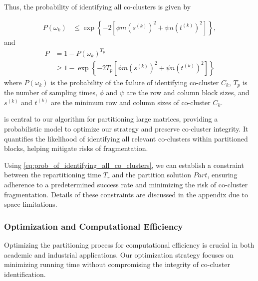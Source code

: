 \documentclass[letterpaper, 10 pt, conference]{ieeeconf}  %
\begin{document}

Thus, the probability of identifying all co-clusters is given by

\begin{equation}
    \begin{split}
        P(\omega_k) & \le \exp \left\{ -2 [\phi m (s^{(k)})^2 + \psi n (t^{(k)})^2] \right\},
    \end{split}
\end{equation}
and
\begin{equation}
    \begin{split}
        P & = 1 - P(\omega_k)^{T_p}                                                                                                       \\
          & \ge 1 - \exp \left\{ -2 T_p [\phi m (s^{(k)})^2 + \psi n (t^{(k)})^2] \right\} \label{eq:prob_of_identifying_all_co_clusters}
    \end{split}
\end{equation}
where $P(\omega_k)$ is the probability of the failure of identifying co-cluster $C_k$, $T_p$ is the number of sampling times, $\phi$ and $\psi$ are the row and column block sizes, and $s^{(k)}$ and $t^{(k)}$ are the minimum row and column sizes of co-cluster $C_k$.

 is central to our algorithm for partitioning large matrices, providing a probabilistic model to optimize our strategy and preserve co-cluster integrity. It quantifies the likelihood of identifying all relevant co-clusters within partitioned blocks, helping mitigate risks of fragmentation.

Using \eqref{eq:prob_of_identifying_all_co_clusters}, we can establish a constraint between the repartitioning time $T_r$ and the partition solution $Part$, ensuring adherence to a predetermined success rate and minimizing the risk of co-cluster fragmentation. Details of these constraints are discussed in the appendix due to space limitations.

\subsubsection{Optimization and Computational Efficiency}
Optimizing the partitioning process for computational efficiency is crucial in both academic and industrial applications. Our optimization strategy focuses on minimizing running time without compromising the integrity of co-cluster identification.
\end{document}
